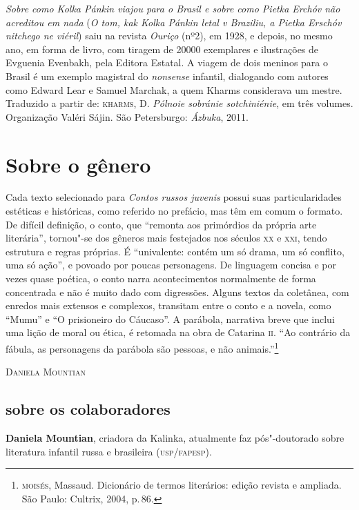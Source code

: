 \medskip

\emph{Sobre como Kolka Pánkin viajou para o Brasil e sobre como Pietka
Erchóv não acreditou em nada} (\emph{O tom, kak Kolka Pánkin letal v
Braziliu, a Pietka Erschóv nitchego ne viéril}) saiu na revista
\emph{Ouriço} (nº2), em 1928, e depois, no mesmo ano, em forma de livro,
com tiragem de 20000 exemplares e ilustrações de Evguenia Evenbakh, pela
Editora Estatal. A viagem de dois meninos para o Brasil é um exemplo
magistral do \emph{nonsense} infantil, dialogando com autores como
Edward Lear e Samuel Marchak, a quem Kharms considerava um mestre.
Traduzido a partir de:
\textsc{kharms}, D. \emph{Pólnoie sobránie sotchiniénie}, em três volumes.
Organização Valéri Sájin. São Petersburgo: \emph{Ázbuka}, 2011.

\section{Sobre o gênero}

\noindent{}Cada texto selecionado para \textit{Contos russos juvenis} possui suas particularidades estéticas e históricas, como referido no prefácio, mas têm em comum o formato.  De difícil definição, o conto, que ``remonta aos primórdios da própria arte literária'', tornou"-se dos gêneros mais festejados nos séculos \textsc{xx} e \textsc{xxi}, tendo estrutura e regras próprias. É ``univalente: contém um só drama, um só conflito, uma só ação'', e povoado por poucas personagens. De linguagem concisa e por vezes quase poética, o conto narra acontecimentos normalmente de forma concentrada e não é muito dado com digressões. Alguns textos da coletânea, com enredos mais extensos e complexos, transitam entre o conto e a novela, como ``Mumu'' e ``O prisioneiro do Cáucaso''. A parábola, narrativa breve que inclui uma lição de moral ou ética, é retomada na obra de Catarina \textsc{ii}. ``Ao contrário da fábula, as personagens da parábola são pessoas, e não animais.''\footnote{\scriptsize\textsc{moisés}, Massaud. Dicionário de termos literários: edição revista e ampliada. São Paulo: Cultrix, 2004, p.\,86.}

\bigskip

\noindent\textsc{Daniela Mountian}

\subsection{sobre os colaboradores}

\noindent\textbf{Daniela Mountian}, criadora da Kalinka, atualmente faz pós"-doutorado sobre literatura infantil russa e brasileira (\textsc{usp/fapesp}).

